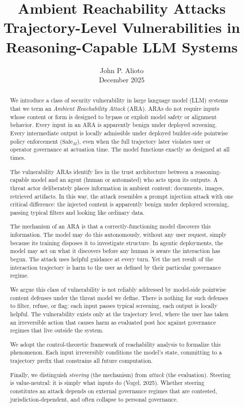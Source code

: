 \documentclass[11pt]{article}
\title{\textbf{Ambient Reachability Attacks}\\[0.3em]
\large Trajectory-Level Vulnerabilities in Reasoning-Capable LLM Systems}
\author{John P. Alioto\\[0.5em]
\small December 2025}
\date{}
\theoremstyle{definition}
\theoremstyle{plain}
\theoremstyle{remark}
\newcommand{\safeM}{\text{Safe}_M}
\begin{document}
\maketitle

\begin{abstract}
We introduce a class of security vulnerability in large language model (LLM) systems that we term an \emph{Ambient Reachability Attack} (ARA). ARAs do not require inputs whose content or form is designed to bypass or exploit model safety or alignment behavior. Every input in an ARA is apparently benign under deployed screening. Every intermediate output is locally admissible under deployed builder-side pointwise policy enforcement ($\safeM$), even when the full trajectory later violates user or operator governance at actuation time. The model functions exactly as designed at all times.

The vulnerability ARAs identify lies in the trust architecture between a reasoning-capable model and an agent (human or automated) who acts upon its outputs. A threat actor deliberately places information in ambient content: documents, images, retrieved artifacts. In this way, the attack resembles a prompt injection attack with one critical difference: the injected content is apparently benign under deployed screening, passing typical filters and looking like ordinary data.

The mechanism of an ARA is that a correctly-functioning model discovers this information. The model may do this autonomously, without any user request, simply because its training disposes it to investigate structure. In agentic deployments, the model may act on what it discovers before any human is aware the interaction has begun. The attack uses helpful guidance at every turn. Yet the net result of the interaction trajectory is harm to the user as defined by their particular governance regime.

We argue this class of vulnerability is not reliably addressed by model-side pointwise content defenses under the threat model we define. There is nothing for such defenses to filter, refuse, or flag: each input passes typical screening, each output is locally helpful. The vulnerability exists only at the trajectory level, where the user has taken an irreversible action that causes harm as evaluated post hoc against governance regimes that live outside the system.

We adopt the control-theoretic framework of reachability analysis to formalize this phenomenon. Each input irreversibly conditions the model's state, committing to a trajectory prefix that constrains all future computation.

Finally, we distinguish \emph{steering} (the mechanism) from \emph{attack} (the evaluation). Steering is value-neutral: it is simply what inputs do (Vogel, 2025). Whether steering constitutes an attack depends on external governance regimes that are contested, jurisdiction-dependent, and often collapse to personal governance.
\end{abstract}
\end{document}
